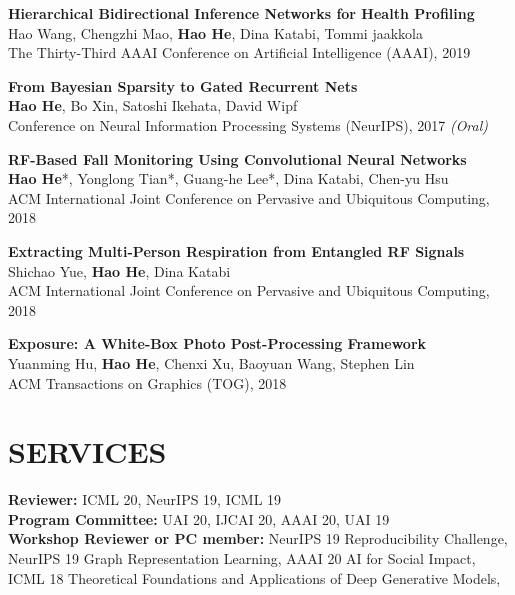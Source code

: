 \documentclass[margin]{res}
\begin{document}
\begin{resume}
\textbf{Hierarchical Bidirectional Inference Networks for Health Profiling}\\
Hao Wang, Chengzhi Mao, \textbf{Hao He}, Dina Katabi, Tommi jaakkola\\
The Thirty-Third AAAI Conference on Artificial Intelligence (AAAI), 2019

\textbf{From Bayesian Sparsity to Gated Recurrent Nets}\\
\textbf{Hao He}, Bo Xin, Satoshi Ikehata, David Wipf\\
Conference on Neural Information Processing Systems (NeurIPS), 2017 \emph{(Oral)}

\textbf{RF-Based Fall Monitoring Using Convolutional Neural Networks}\\
\textbf{Hao He}*, Yonglong Tian*, Guang-he Lee*, Dina Katabi, Chen-yu Hsu\\
ACM International Joint Conference on Pervasive and Ubiquitous Computing, 2018

\textbf{Extracting Multi-Person Respiration from Entangled RF Signals}\\
Shichao Yue, \textbf{Hao He}, Dina Katabi \\
ACM International Joint Conference on Pervasive and Ubiquitous Computing, 2018

\textbf{Exposure: A White-Box Photo Post-Processing Framework}\\
Yuanming Hu, \textbf{Hao He}, Chenxi Xu, Baoyuan Wang, Stephen Lin\\
ACM Transactions on Graphics (TOG), 2018


\section{SERVICES}
\textbf{Reviewer:} ICML 20, NeurIPS 19, ICML 19\\
\textbf{Program Committee:} UAI 20, IJCAI 20, AAAI 20, UAI 19\\
\textbf{Workshop Reviewer or PC member:} NeurIPS 19 Reproducibility Challenge, NeurIPS 19 Graph Representation Learning, AAAI 20 AI for Social Impact, ICML 18 Theoretical Foundations and Applications of Deep Generative Models,


\end{resume}
\end{document}
